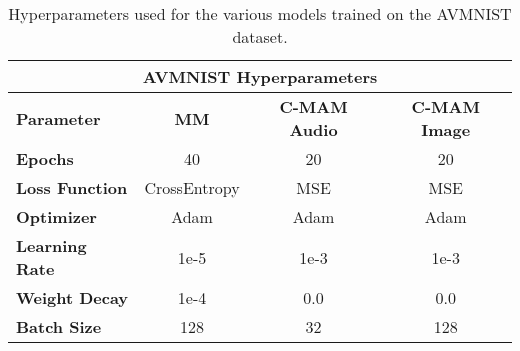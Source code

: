 \begin{table}[h!]
\footnotesize
\centering
\caption{Hyperparameters used for the various models trained on the AVMNIST dataset.}
\label{tab:avmnist_hypparams}
\begin{tabular}{lccc}
\hline
\multicolumn{4}{c}{\textbf{AVMNIST Hyperparameters}}                     \\ \hline
\multicolumn{1}{l|}{\textbf{Parameter}} & \textbf{MM} & \textbf{C-MAM Audio} & \textbf{C-MAM Image} \\ \hline
\multicolumn{1}{l|}{\textbf{Epochs}}        & 40           & 20   & 20   \\
\multicolumn{1}{l|}{\textbf{Loss Function}} & CrossEntropy & MSE  & MSE  \\
\multicolumn{1}{l|}{\textbf{Optimizer}}     & Adam         & Adam & Adam \\
\multicolumn{1}{l|}{\textbf{Learning Rate}} & 1e-5         & 1e-3 & 1e-3 \\
\multicolumn{1}{l|}{\textbf{Weight Decay}}  & 1e-4         & 0.0  & 0.0  \\
\multicolumn{1}{l|}{\textbf{Batch Size}}    & 128          & 32   & 128  \\ \hline
\end{tabular}%
\end{table}

